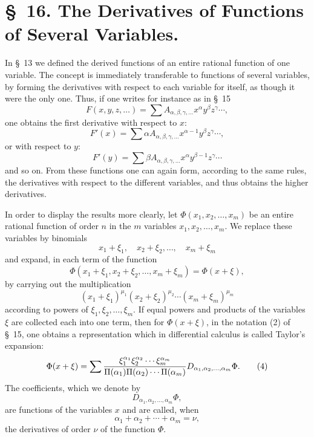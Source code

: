\documentclass[11pt]{article}
\begin{document}
\section*{\S~16. The Derivatives of Functions of Several Variables.}

In \S~13 we defined the derived functions of an entire rational function of one variable. The concept is immediately transferable to functions of several variables, by forming the derivatives with respect to each variable for itself, as though it were the only one. Thus, if one writes for instance as in \S~15
\begin{equation}
 F(x,y,z,\ldots)=\sum A_{\alpha,\beta,\gamma,\ldots}x^\alpha y^\beta z^\gamma\cdots,
\tag{1}
\end{equation}
one obtains the first derivative with respect to $x$:
\begin{equation}
 F'(x)=\sum \alpha A_{\alpha,\beta,\gamma,\ldots}x^{\alpha-1}y^\beta z^\gamma\cdots,
\tag{2}
\end{equation}
or with respect to $y$:
\begin{equation}
 F'(y)=\sum \beta A_{\alpha,\beta,\gamma,\ldots}x^\alpha y^{\beta-1}z^\gamma\cdots
\tag{3}
\end{equation}
and so on. From these functions one can again form, according to the same rules, the derivatives with respect to the different variables, and thus obtains the higher derivatives.

In order to display the results more clearly, let $\Phi(x_1,x_2,\ldots,x_m)$ be an entire rational function of order $n$ in the $m$ variables $x_1,x_2,\ldots,x_m$. We replace these variables by binomials
\[
 x_1+\xi_1,\quad x_2+\xi_2,\ldots,\quad x_m+\xi_m
\]
and expand, in each term of the function
\[
 \Phi(x_1+\xi_1,x_2+\xi_2,\ldots,x_m+\xi_m)=\Phi(x+\xi),
\]
by carrying out the multiplication
\[
 (x_1+\xi_1)^{\mu_1}(x_2+\xi_2)^{\mu_2}\cdots(x_m+\xi_m)^{\mu_m}
\]
according to powers of $\xi_1,\xi_2,\ldots,\xi_m$. If equal powers and products of the variables $\xi$ are collected each into one term, then for $\Phi(x+\xi)$, in the notation (2) of \S~15, one obtains a representation which in differential calculus is called Taylor's expansion:
\begin{equation}
 \Phi(x+\xi)=\sum
 {\xi_1^{\alpha_1}\xi_2^{\alpha_2}\cdots\xi_m^{\alpha_m}
 \over \Pi(\alpha_1)\Pi(\alpha_2)\cdots\Pi(\alpha_m)}
 D_{\alpha_1,\alpha_2,\ldots,\alpha_m}\Phi .
\tag{4}
\end{equation}
The coefficients, which we denote by
\[
 D_{\alpha_1,\alpha_2,\ldots,\alpha_m}\Phi,
\]
are functions of the variables $x$ and are called, when
\[
 \alpha_1+\alpha_2+\cdots+\alpha_m=\nu,
\]
the derivatives of order $\nu$ of the function $\Phi$.
\end{document}
